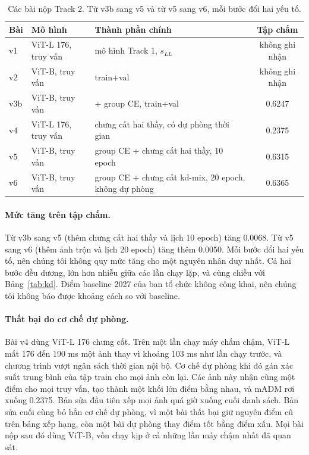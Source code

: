 \documentclass[11pt,a4paper]{article}
\begin{document}
\begin{table}[H]
\centering\small
\begin{tabularx}{\linewidth}{@{}llXc@{}}
\toprule
Bài & Mô hình & Thành phần chính & Tập chấm \\
\midrule
v1 & ViT-L 176, truy vấn & mô hình Track 1, $s_{LL}$ & không ghi nhận \\
v2 & ViT-B, truy vấn & train+val & không ghi nhận \\
v3b & ViT-B, truy vấn & + group CE, train+val & 0.6247 \\
v4 & ViT-L 176, truy vấn & chưng cất hai thầy, có dự phòng thời gian & 0.2375 \\
v5 & ViT-B, truy vấn & group CE + chưng cất hai thầy, 10 epoch & 0.6315 \\
v6 & ViT-B, truy vấn & group CE + chưng cất kd-mix, 20 epoch, không dự phòng & 0.6365 \\
\bottomrule
\end{tabularx}
\caption{Các bài nộp Track 2. Từ v3b sang v5 và từ v5 sang v6, mỗi bước đổi hai yếu tố.}
\label{tab:lb}
\end{table}

\paragraph{Mức tăng trên tập chấm.} Từ v3b sang v5 (thêm chưng cất hai thầy và lịch 10 epoch) tăng 0.0068. Từ v5 sang v6 (thêm ảnh trộn và lịch 20 epoch) tăng thêm 0.0050. Mỗi bước đổi hai yếu tố, nên chúng tôi không quy mức tăng cho một nguyên nhân duy nhất. Cả hai bước đều dương, lớn hơn nhiễu giữa các lần chạy lặp, và cùng chiều với Bảng~\ref{tab:kd}. Điểm baseline 2027 của ban tổ chức không công khai, nên chúng tôi không báo được khoảng cách so với baseline.

\paragraph{Thất bại do cơ chế dự phòng.} Bài v4 dùng ViT-L 176 chưng cất. Trên một lần chạy máy chấm chậm, ViT-L mất 176 đến 190 ms một ảnh thay vì khoảng 103 ms như lần chạy trước, và chương trình vượt ngân sách thời gian nội bộ. Cơ chế dự phòng khi đó gán xác suất trung bình của tập train cho mọi ảnh còn lại. Các ảnh này nhận cùng một điểm cho mọi truy vấn, tạo thành một khối lớn điểm bằng nhau, và mADM rơi xuống 0.2375. Bản sửa đầu tiên xếp mọi ảnh quá giờ xuống cuối danh sách. Bản sửa cuối cùng bỏ hẳn cơ chế dự phòng, vì một bài thất bại giữ nguyên điểm cũ trên bảng xếp hạng, còn một bài dự phòng thay điểm tốt bằng điểm xấu. Mọi bài nộp sau đó dùng ViT-B, vốn chạy kịp ở cả những lần máy chậm nhất đã quan sát.
\end{document}
